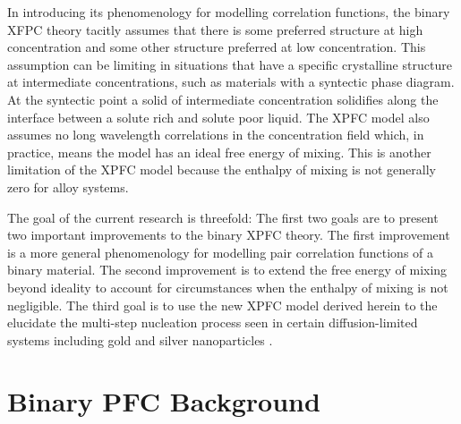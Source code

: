 \documentclass[showkeys, prb, reprint]{revtex4-1}
\begin{document}

In introducing its phenomenology for modelling correlation functions, the
binary XFPC theory tacitly assumes that there is some preferred structure at
high concentration and some other structure preferred at low concentration.
This assumption can be limiting in situations that have a specific crystalline
structure at intermediate concentrations, such as materials with a syntectic
phase diagram. At the syntectic point a solid of intermediate concentration
solidifies along the interface between a solute rich and solute poor liquid.
The XPFC model also assumes no long wavelength correlations in the
concentration field which, in practice, means the model has an ideal free
energy of mixing.  This is another limitation of the XPFC model because the
enthalpy of mixing is not generally zero for alloy systems.


The goal of the current research is threefold: The first two goals are to
present two important improvements to the binary XPFC theory. The first
improvement is a more general phenomenology for modelling pair correlation
functions of a binary material. The second improvement is to extend the free
energy of mixing beyond ideality to account for circumstances when the enthalpy of
mixing is not negligible. The third goal is to use the new XPFC model derived
herein to the elucidate the multi-step nucleation process seen in certain
diffusion-limited systems including gold and silver nanoparticles \cite{LOH17}.

\section{Binary PFC Background} %
\end{document}
